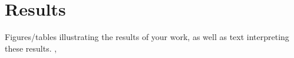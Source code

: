 \documentclass{6838publ}
\newcommand\R{\ensuremath{\mathbb{R}}} %
\DeclareMathOperator*{\diag}{diag} %
\begin{document}

 












\section{Results}

Figures/tables illustrating the results of your work, as well as text interpreting these results. \cite{peyreComputationalOptimalTransport2020},




\end{document}
